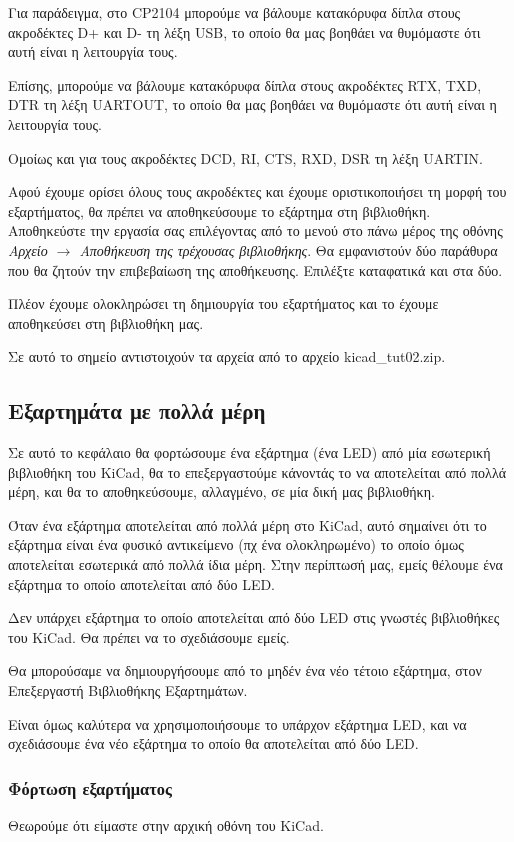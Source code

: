 \documentclass[a4paper]{article}
\begin{document}
Για παράδειγμα, στο CP2104 μπορούμε να βάλουμε κατακόρυφα δίπλα στους ακροδέκτες D+ και D- τη λέξη USB, το οποίο θα μας βοηθάει να θυμόμαστε ότι αυτή είναι η λειτουργία τους.

Επίσης, μπορούμε να βάλουμε κατακόρυφα δίπλα στους ακροδέκτες RTX, TXD, DTR τη λέξη UARTOUT, το οποίο θα μας βοηθάει να θυμόμαστε ότι αυτή είναι η λειτουργία τους.

Ομοίως και για τους ακροδέκτες DCD, RI, CTS, RXD, DSR τη λέξη UARTΙΝ.

Αφού έχουμε ορίσει όλους τους ακροδέκτες και έχουμε οριστικοποιήσει τη μορφή του εξαρτήματος, θα πρέπει να αποθηκεύσουμε το εξάρτημα στη βιβλιοθήκη. Αποθηκεύστε την εργασία σας επιλέγοντας από το μενού στο πάνω μέρος της οθόνης \textit{Αρχείο $\rightarrow$ Αποθήκευση της τρέχουσας βιβλιοθήκης}. Θα εμφανιστούν δύο παράθυρα που θα ζητούν την επιβεβαίωση της αποθήκευσης. Επιλέξτε καταφατικά και στα δύο.

Πλέον έχουμε ολοκληρώσει τη δημιουργία του εξαρτήματος και το έχουμε αποθηκεύσει στη βιβλιοθήκη μας.

Σε αυτό το σημείο αντιστοιχούν τα αρχεία από το αρχείο kicad\_tut02.zip.

\subsection{Εξαρτημάτα με πολλά μέρη}

Σε αυτό το κεφάλαιο θα φορτώσουμε ένα εξάρτημα (ένα LED) από μία εσωτερική βιβλιοθήκη του \textenglish{KiCad}, θα το επεξεργαστούμε κάνοντάς το να αποτελείται από πολλά μέρη, και θα το αποθηκεύσουμε, αλλαγμένο, σε μία δική μας βιβλιοθήκη.

Όταν ένα εξάρτημα αποτελείται από πολλά μέρη στο \textenglish{KiCad}, αυτό σημαίνει ότι το εξάρτημα είναι ένα φυσικό αντικείμενο (πχ ένα ολοκληρωμένο) το οποίο όμως αποτελείται εσωτερικά από πολλά ίδια μέρη. Στην περίπτωσή μας, εμείς θέλουμε ένα εξάρτημα το οποίο αποτελείται από δύο LED.

Δεν υπάρχει εξάρτημα το οποίο αποτελείται από δύο LED στις γνωστές βιβλιοθήκες του \textenglish{KiCad}. Θα πρέπει να το σχεδιάσουμε εμείς.

Θα μπορούσαμε να δημιουργήσουμε από το μηδέν ένα νέο τέτοιο εξάρτημα, στον Επεξεργαστή Βιβλιοθήκης Εξαρτημάτων. 

Είναι όμως καλύτερα να χρησιμοποιήσουμε το υπάρχον εξάρτημα LED, και να σχεδιάσουμε ένα νέο εξάρτημα το οποίο θα αποτελείται από δύο LED.

\subsubsection{Φόρτωση εξαρτήματος}
Θεωρούμε ότι είμαστε στην αρχική οθόνη του \textenglish{KiCad}. 
\end{document}
